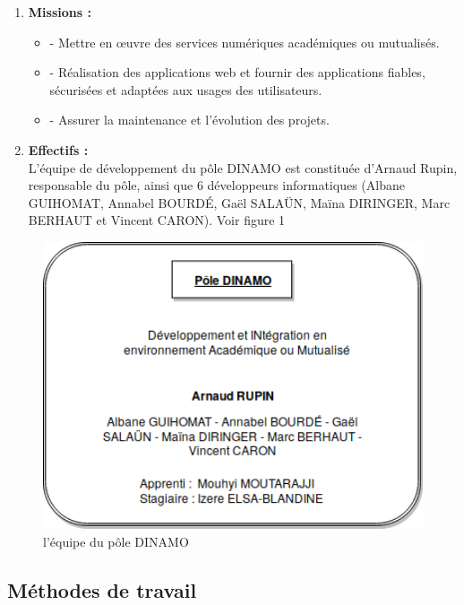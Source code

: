\documentclass[12pt]{article}
\begin{document}
\begin{enumerate}
\item \textbf{Missions :}\\

\begin{itemize}
\item - Mettre en œuvre des services numériques académiques ou mutualisés.
\item - Réalisation des applications web et fournir des applications fiables, sécurisées et adaptées aux usages des utilisateurs. 
\item - Assurer la maintenance et l'évolution des projets.\\
\end{itemize}

\item \textbf{Effectifs :}\\
L’équipe de développement du pôle DINAMO est constituée d’Arnaud Rupin, responsable du pôle, ainsi que 6 développeurs informatiques (Albane GUIHOMAT, Annabel BOURDÉ, Gaël SALAÜN, Maïna DIRINGER, Marc BERHAUT et Vincent CARON). Voir figure 1\\

\end{enumerate}

\begin{figure}[H]
	\centering
 		\includegraphics[width=1\textwidth]{diagrammes/PoleDinamo.png}
  		\caption{l'équipe du pôle DINAMO}
	\end{figure}


\subsection{Méthodes de travail}
\end{document}
